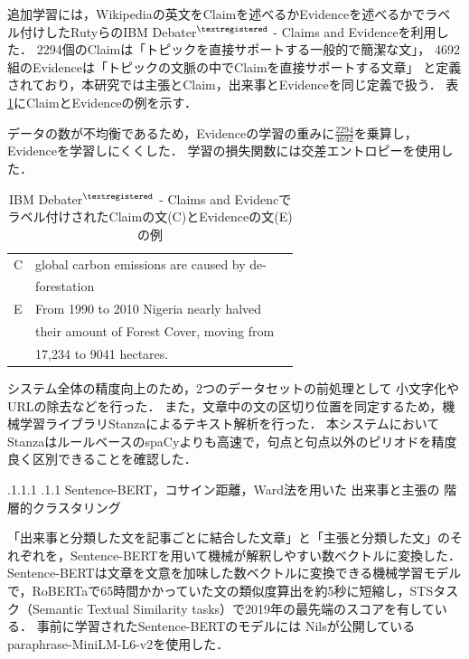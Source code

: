 \documentclass[a4paper, twocolumn, 10pt]{jarticle}
\makeatletter
\def\subsection{%
	\@startsection{subsection}{1}{\z@}%
	{.1\Cvs \@plus.1\Cdp \@minus.1\Cdp}%
	{.1\Cvs \@plus.1\Cdp}%
	{\normalfont\normalsize\bfseries}%
}
\makeatother
\begin{document}
追加学習には，Wikipediaの英文をClaimを述べるかEvidenceを述べるかでラベル付けしたRutyらのIBM Debater$^{\textregistered}$ - Claims and Evidenceを利用した\cite{rinott_show_2015}．
2294個のClaimは「トピックを直接サポートする一般的で簡潔な文」，
4692組のEvidenceは「トピックの文脈の中でClaimを直接サポートする文章」
と定義されており，本研究では主張とClaim，出来事とEvidenceを同じ定義で扱う．
表\ref{claim_evidence_example}にClaimとEvidenceの例を示す．

データの数が不均衡であるため，Evidenceの学習の重みに$\frac{2294}{4692}$を乗算し，Evidenceを学習しにくくした．
学習の損失関数には交差エントロピーを使用した．

\begin{table}[H]
  \caption{IBM Debater$^{\textregistered}$ - Claims and Evidencでラベル付けされたClaimの文(C)とEvidenceの文(E)の例}
  \centering
  \begin{tabular}{llp{6cm}}
    \hline
    C & global carbon emissions are caused by de-
    \\
    & forestation
    \\
    E & From 1990 to 2010 Nigeria nearly halved
    \\
    & their amount of Forest Cover, moving from
    \\
    & 17,234 to 9041 hectares.
    \\
    \hline
  \end{tabular}
  \label{claim_evidence_example}
\end{table}

システム全体の精度向上のため，2つのデータセットの前処理として
小文字化やURLの除去などを行った．
また，文章中の文の区切り位置を同定するため，機械学習ライブラリStanzaによるテキスト解析を行った\cite{qi_stanza_2020}．
本システムにおいてStanzaはルールベースのspaCyよりも高速で，句点と句点以外のピリオドを精度良く区別できることを確認した．



\subsection{
Sentence-BERT，コサイン距離，Ward法を用いた
出来事と主張の
階層的クラスタリング
}

「出来事と分類した文を記事ごとに結合した文章」と「主張と分類した文」のそれぞれを，Sentence-BERTを用いて機械が解釈しやすい数ベクトルに変換した．
Sentence-BERTは文章を文意を加味した数ベクトルに変換できる機械学習モデルで，RoBERTaで65時間かかっていた文の類似度算出を約5秒に短縮し，STSタスク（Semantic Textual Similarity tasks）で2019年の最先端のスコアを有している\cite{reimers_sentence-bert_2019}．
事前に学習されたSentence-BERTのモデルには
Nilsが公開しているparaphrase-MiniLM-L6-v2を使用した．
\end{document}
